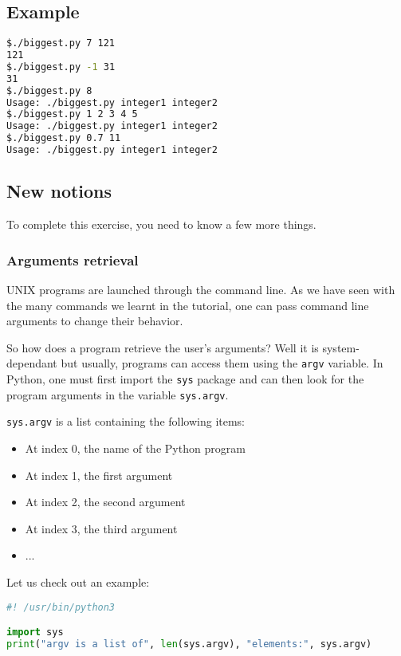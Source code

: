 \documentclass[12pt]{article}
\begin{document}
\subsection{Example}

\begin{lstlisting}[language=bash]
$./biggest.py 7 121
121
$./biggest.py -1 31
31
$./biggest.py 8
Usage: ./biggest.py integer1 integer2
$./biggest.py 1 2 3 4 5
Usage: ./biggest.py integer1 integer2
$./biggest.py 0.7 11
Usage: ./biggest.py integer1 integer2
\end{lstlisting}

\subsection{New notions}

To complete this exercise, you need to know a few more things.

\subsubsection{Arguments retrieval}

UNIX programs are launched through the command line. As we have seen with the many commands we learnt in the tutorial, one can pass command line arguments to change their behavior.

So how does a program retrieve the user's arguments? Well it is system-dependant but usually, programs can access them using the \texttt{argv} variable. In Python, one must first import the \texttt{sys} package and can then look for the program arguments in the variable \texttt{sys.argv}.

\texttt{sys.argv} is a list containing the following items:

\begin{itemize}
\item At index 0, the name of the Python program
\item At index 1, the first argument
\item At index 2, the second argument
\item At index 3, the third argument
\item ...
\end{itemize}

Let us check out an example:

\begin{lstlisting}[language=python,style=codestyle,title=print\_argv.py]
#! /usr/bin/python3

import sys
print("argv is a list of", len(sys.argv), "elements:", sys.argv)
\end{lstlisting}
\end{document}
